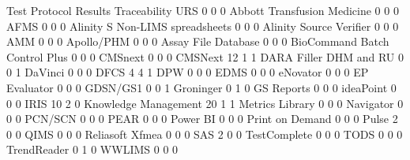 \documentclass{article}
\begin{document}
\begin{Schunk}
\begin{Soutput}
                                  Test Protocol Results Traceability URS
                                                      0            0   0
  Abbott Transfusion Medicine                         0            0   0
  AFMS                                                0            0   0
  Alinity S Non-LIMS spreadsheets                     0            0   0
  Alinity Source Verifier                             0            0   0
  AMM                                                 0            0   0
  Apollo/PHM                                          0            0   0
  Assay File Database                                 0            0   0
  BioCommand Batch Control Plus                       0            0   0
  CMSnext                                             0            0   0
  CMSNext                                            12            1   1
  DARA Filler DHM and RU                              0            0   1
  DaVinci                                             0            0   0
  DFCS                                                4            4   1
  DPW                                                 0            0   0
  EDMS                                                0            0   0
  eNovator                                            0            0   0
  EP Evaluator                                        0            0   0
  GDSN/GS1                                            0            0   1
  Groninger                                           0            1   0
  GS Reports                                          0            0   0
  ideaPoint                                           0            0   0
  IRIS                                               10            2   0
  Knowledge Management                               20            1   1
  Metrics Library                                     0            0   0
  Navigator                                           0            0   0
  PCN/SCN                                             0            0   0
  PEAR                                                0            0   0
  Power BI                                            0            0   0
  Print on Demand                                     0            0   0
  Pulse                                               2            0   0
  QIMS                                                0            0   0
  Reliasoft Xfmea                                     0            0   0
  SAS                                                 2            0   0
  TestComplete                                        0            0   0
  TODS                                                0            0   0
  TrendReader                                         0            1   0
  WWLIMS                                              0            0   0
                                 

\end{Soutput}
\end{Schunk}
\end{document}
